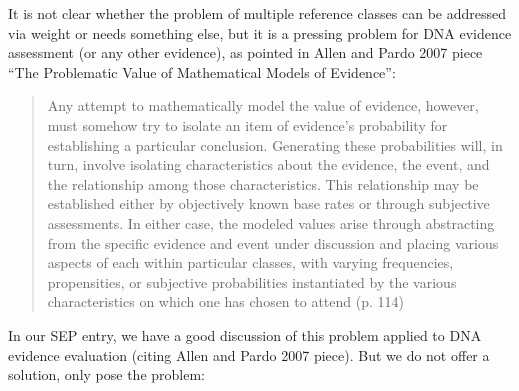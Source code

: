 \documentclass[
  10pt,
  dvipsnames,enabledeprecatedfontcommands]{scrartcl}
\begin{document}
It is not clear whether the problem of multiple reference classes can be
addressed via weight or needs something else, but it is a pressing
problem for DNA evidence assessment (or any other evidence), as pointed
in Allen and Pardo 2007 piece ``The Problematic Value of Mathematical
Models of Evidence'':

\begin{quote}
Any attempt to mathematically model the value of evidence, however,
must somehow try to isolate an item of evidence’s probability for establishing a particular conclusion. Generating these probabilities will,
in turn, involve isolating characteristics about the evidence, the event,
and the relationship among those characteristics. This relationship may
be established either by objectively known base rates or through subjective assessments. In either case, the modeled values arise through
abstracting from the specific evidence and event under discussion and
placing various aspects of each within particular classes, with varying
frequencies, propensities, or subjective probabilities instantiated by the
various characteristics on which one has chosen to attend (p. 114)
\end{quote}

In our SEP entry, we have a good discussion of this problem applied to
DNA evidence evaluation (citing Allen and Pardo 2007 piece). But we do
not offer a solution, only pose the problem:
\end{document}
